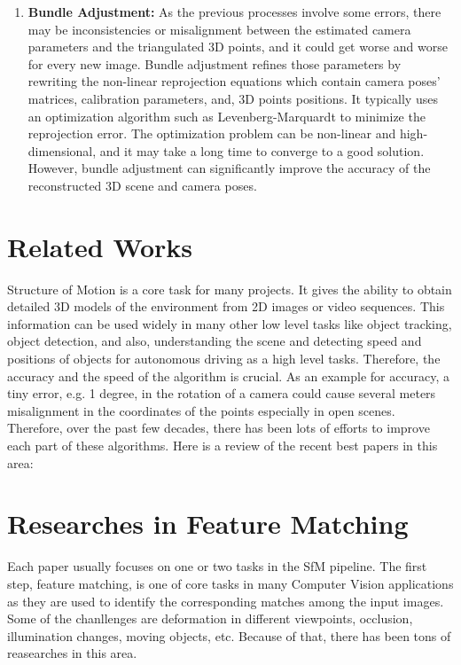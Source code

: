 \documentclass[11pt]{article}
\begin{document}
\begin{enumerate}
        \item \textbf{Bundle Adjustment:} As the previous processes involve some errors, there may be inconsistencies
        or misalignment between the estimated camera parameters and the triangulated 3D points, and it could get worse
        and worse for every new image. Bundle adjustment refines those parameters by rewriting the non-linear
        reprojection equations which contain camera poses' matrices, calibration parameters, and, 3D points positions.
        It typically uses an optimization algorithm such as Levenberg-Marquardt to minimize
        the reprojection error. The optimization problem can be non-linear and high-dimensional, and it may take a
        long time to converge to a good solution. However, bundle adjustment can significantly improve the accuracy
        of the reconstructed 3D scene and camera poses.

    \end{enumerate}

    \newpage
    \section{Related Works}
    Structure of Motion is a core task for many projects. It gives the ability to obtain detailed 3D models
    of the environment from 2D images or video sequences. This information can be used widely in many other
    low level tasks like object tracking, object detection, and also, understanding the scene and detecting speed and
    positions of objects for autonomous driving as a high level tasks. Therefore, the accuracy and the speed
    of the algorithm is crucial. As an example for accuracy, a tiny error, e.g. 1 degree, in the rotation of
    a camera could cause several meters misalignment in the coordinates of the points especially in open scenes.
    Therefore, over the past few decades, there has been lots of efforts to improve each part of these algorithms.
    Here is a review of the recent best papers in this area:

    \newpage
    \section{Researches in Feature Matching}
    Each paper usually focuses on one or two tasks in the SfM pipeline. The first step, feature matching,
    is one of core tasks in many Computer Vision applications as they are used to identify the corresponding
    matches among the input images. Some of the chanllenges are deformation in different viewpoints, occlusion,
    illumination changes, moving objects, etc. Because of that, there has been tons of reasearches in this area.
\end{document}
